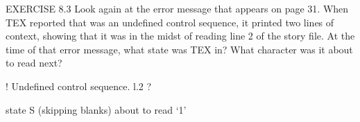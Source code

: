 EXERCISE 8.3
Look again at the error message that appears on page 31. When TEX reported
that \vship was an undefined control sequence, it printed two lines of context, showing
that it was in the midst of reading line 2 of the story file. At the time of that error
message, what state was TEX in? What character was it about to read next?


! Undefined control sequence.
l.2 \vship
1in
?

state S (skipping blanks)
about to read `1'


\bye


